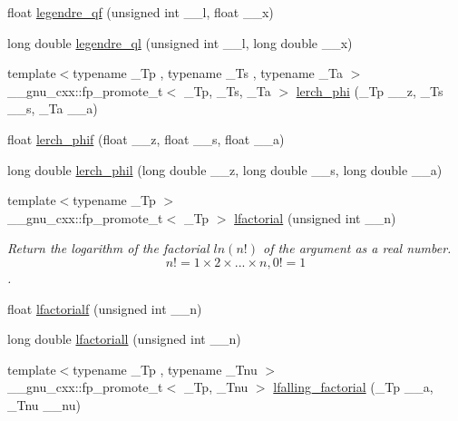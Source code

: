 \begin{DoxyCompactItemize}
\item 
float \hyperlink{group__mathsf__gnu_ga46cf4d58886af402c6776bc090b4e4a7}{legendre\+\_\+qf} (unsigned int \+\_\+\+\_\+l, float \+\_\+\+\_\+x)
\item 
long double \hyperlink{group__mathsf__gnu_ga60feac5a8bd733abee6610adf15208f2}{legendre\+\_\+ql} (unsigned int \+\_\+\+\_\+l, long double \+\_\+\+\_\+x)
\item 
{\footnotesize template$<$typename \+\_\+\+Tp , typename \+\_\+\+Ts , typename \+\_\+\+Ta $>$ }\\\+\_\+\+\_\+gnu\+\_\+cxx\+::fp\+\_\+promote\+\_\+t$<$ \+\_\+\+Tp, \+\_\+\+Ts, \+\_\+\+Ta $>$ \hyperlink{group__mathsf__gnu_ga31d7cfc601a99d72e58f654d0c890fd6}{lerch\+\_\+phi} (\+\_\+\+Tp \+\_\+\+\_\+z, \+\_\+\+Ts \+\_\+\+\_\+s, \+\_\+\+Ta \+\_\+\+\_\+a)
\item 
float \hyperlink{group__mathsf__gnu_ga90ae3ca570b08b3f458aa83ec2759be3}{lerch\+\_\+phif} (float \+\_\+\+\_\+z, float \+\_\+\+\_\+s, float \+\_\+\+\_\+a)
\item 
long double \hyperlink{group__mathsf__gnu_gab975fa919ede92ec176330809c16c8d5}{lerch\+\_\+phil} (long double \+\_\+\+\_\+z, long double \+\_\+\+\_\+s, long double \+\_\+\+\_\+a)
\item 
{\footnotesize template$<$typename \+\_\+\+Tp $>$ }\\\+\_\+\+\_\+gnu\+\_\+cxx\+::fp\+\_\+promote\+\_\+t$<$ \+\_\+\+Tp $>$ \hyperlink{group__mathsf__gnu_gab256f8d7b77b9a8fefafca21827166eb}{lfactorial} (unsigned int \+\_\+\+\_\+n)
\begin{DoxyCompactList}\small\item\em Return the logarithm of the factorial $ ln(n!) $ of the argument as a real number. \[ n! = 1 \times 2 \times ... \times n, 0! = 1 \]. \end{DoxyCompactList}\item 
float \hyperlink{group__mathsf__gnu_ga65af05c4093d4895a564a8d67e389a9b}{lfactorialf} (unsigned int \+\_\+\+\_\+n)
\item 
long double \hyperlink{group__mathsf__gnu_ga3a0c196f34916dc68c29c89f26cbe1ee}{lfactoriall} (unsigned int \+\_\+\+\_\+n)
\item 
{\footnotesize template$<$typename \+\_\+\+Tp , typename \+\_\+\+Tnu $>$ }\\\+\_\+\+\_\+gnu\+\_\+cxx\+::fp\+\_\+promote\+\_\+t$<$ \+\_\+\+Tp, \+\_\+\+Tnu $>$ \hyperlink{group__mathsf__gnu_ga2032c10640d5010666d60d9faec86c32}{lfalling\+\_\+factorial} (\+\_\+\+Tp \+\_\+\+\_\+a, \+\_\+\+Tnu \+\_\+\+\_\+nu)

\end{DoxyCompactItemize}
